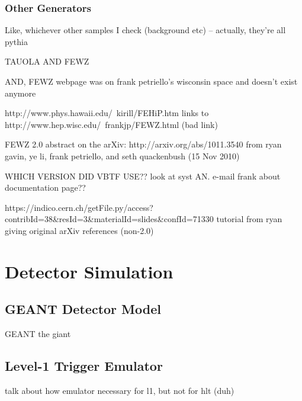 \subsubsection{Other Generators}
\label{sim:MCGensOther}
Like, whichever other samples I check (background etc) -- actually, they're all pythia

TAUOLA AND FEWZ

AND, FEWZ webpage was on frank petriello's wisconsin space and doesn't exist anymore

http://www.phys.hawaii.edu/~kirill/FEHiP.htm links to 
http://www.hep.wisc.edu/~frankjp/FEWZ.html (bad link)

FEWZ 2.0 abstract on the arXiv: http://arxiv.org/abs/1011.3540 
from ryan gavin, ye li, frank petriello, and seth quackenbush (15 Nov 2010)

WHICH VERSION DID VBTF USE??  look at syst AN.  
e-mail frank about documentation page??

https://indico.cern.ch/getFile.py/access?contribId=38\&resId=3\&materialId=slides\&confId=71330  tutorial from ryan giving original arXiv references (non-2.0)




\section{Detector Simulation}
\label{sim:Detector}

\subsection{GEANT Detector Model}
\label{sim:DetectorGeant}

GEANT the giant

\subsection{Level-1 Trigger Emulator}
\label{sim:DetectorL1Emul}
talk about how emulator necessary for l1, but not for hlt (duh)
